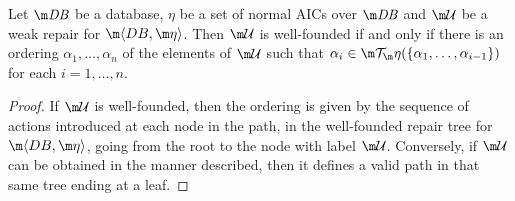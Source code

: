 \begin{proposition}
  \label{lem:wf}
  Let $\db$ be a database, $\eta$ be a set of normal AICs over $\db$ and $\UU$ be a weak repair for $\fulldb$.
  Then $\UU$ is well-founded if and only if there is an ordering $\alpha_1,\ldots,\alpha_n$ of the elements of $\UU$ such that $\alpha_i\in\Op(\{\alpha_1,\ldots,\alpha_{i-1}\})$ for each $i=1,\ldots,n$.
\end{proposition}
\begin{proof}
  If $\UU$ is well-founded, then the ordering is given by the sequence of actions introduced at each node in the path, in the well-founded repair tree for $\fulldb$, going from the root to the node with label $\UU$.
  Conversely, if $\UU$ can be obtained in the manner described, then it defines a valid path in that same tree ending at a leaf.
\end{proof}




